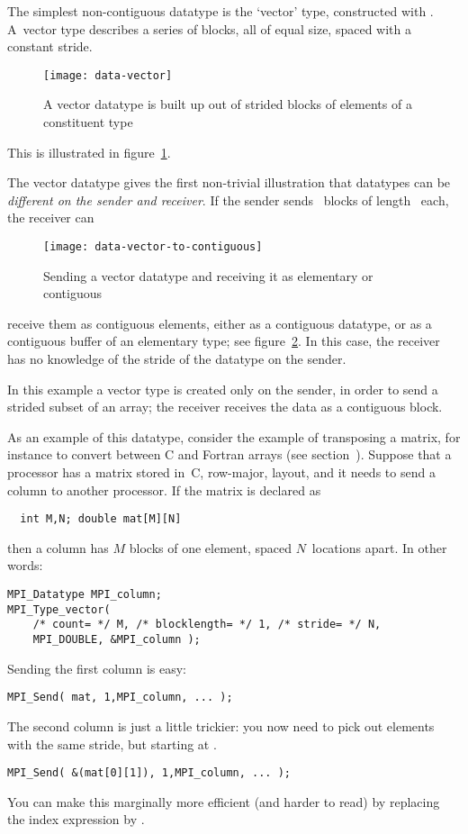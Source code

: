 The simplest non-contiguous datatype is the `vector' type, constructed with
.
%
%
A~vector type describes a series of blocks, all 
of equal size, spaced with a constant stride.
\begin{figure}[ht]
  \texttt{[image: data-vector]}
  \caption{A vector datatype is built up out of strided blocks of elements of a constituent type}
  \label{fig:data-vector}
\end{figure}
This is illustrated in figure~\ref{fig:data-vector}.

The vector datatype gives the first non-trivial illustration that
datatypes can be \emph{different on the sender and
  receiver}. If the
sender sends ~blocks of length~ each, the receiver can
%
\begin{figure}
  \texttt{[image: data-vector-to-contiguous]}
  \caption{Sending a vector datatype and receiving it as elementary or
    contiguous}
  \label{fig:data-vector-to-contiguous}
\end{figure}
%
receive them as  contiguous elements, either as a contiguous
datatype, or as a contiguous buffer of an elementary type; see
figure~\ref{fig:data-vector-to-contiguous}. In this case, the receiver
has no knowledge of the stride of the datatype on the sender.

In this example a vector type is created only on the sender, in order to send
a strided subset of an array; the receiver receives the data as a contiguous block.

As an example of this datatype, consider the example of transposing
a matrix, for instance to convert between
C and Fortran arrays (see section~). Suppose that 
a processor has a matrix stored in~C, row-major, layout, and it needs
to send a column to another processor. If the matrix is declared as
\begin{verbatim}
  int M,N; double mat[M][N]
\end{verbatim}
then a column has $M$ blocks of one element, spaced $N$~locations apart.
In other words:
\begin{verbatim}
MPI_Datatype MPI_column;
MPI_Type_vector( 
    /* count= */ M, /* blocklength= */ 1, /* stride= */ N,
    MPI_DOUBLE, &MPI_column );
\end{verbatim}
Sending the first column is easy:
\begin{verbatim}
MPI_Send( mat, 1,MPI_column, ... );
\end{verbatim}
The second column is just a little trickier: you now need to pick out 
elements with the same stride, but starting at .
\begin{verbatim}
MPI_Send( &(mat[0][1]), 1,MPI_column, ... );
\end{verbatim}
You can make this marginally more efficient (and harder to read)
by replacing the index expression by .

